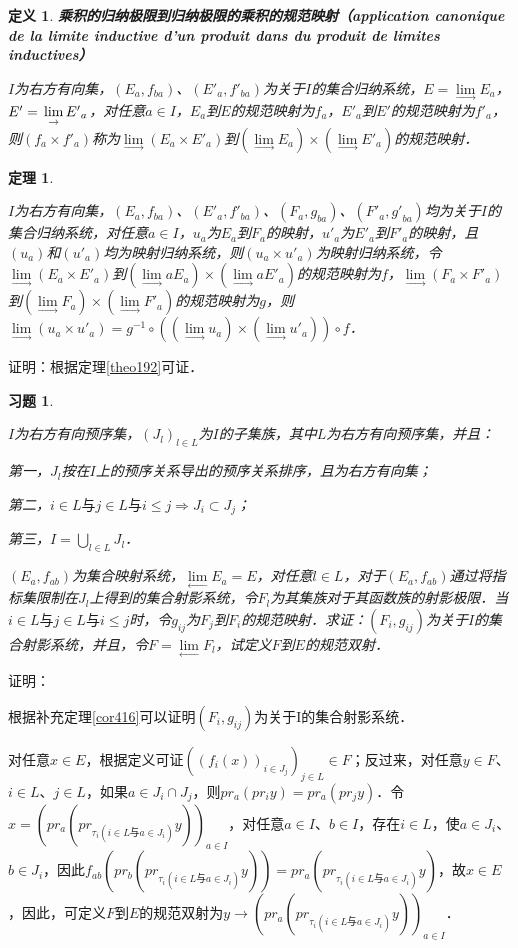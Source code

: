 \documentclass[12pt, a4paper, oneside]{book}
\newtheorem{theo}{定理}
\newtheorem{de}{定义}
\newtheorem{exer}{习题}
\begin{document}
			\begin{de}
				\textbf{乘积的归纳极限到归纳极限的乘积的规范映射（application canonique de la limite inductive d'un produit dans du produit de limites inductives）}
				\par
				$I$为右方有向集，$(E_a, f_{ba})$、$({E'}_a, {f'}_{ba})$为关于$I$的集合归纳系统，$E=\lim\limits_\to E_a$，$E'=\\\lim\limits_\to {E'}_a$，对任意$a\in I$，$E_a$到$E$的规范映射为$f_a$，${E'}_a$到$E'$的规范映射为${f'}_a$，则$(f_a\times {f'}_a)$称为$\lim\limits_\to (E_a\times {E'}_a)$到$(\lim\limits_\to E_a)\times (\lim\limits_\to{E'}_a)$的规范映射．
			\end{de}
					
			\begin{theo}\label{theo193}
				\hfill\par
				$I$为右方有向集，$(E_a, f_{ba})$、$({E'}_a, {f'}_{ba})$、$(F_a, g_{ba})$、$({F'}_a, {g'}_{ba})$均为关于$I$的集合归纳系统，对任意$a\in I$，$u_a$为$E_a$到$F_a$的映射，${u'}_a$为${E'}_a$到${F'}_a$的映射，且$(u_a)$和$({u'}_a)$均为映射归纳系统，则$(u_a\times {u'}_a)$为映射归纳系统，令$\lim\limits_\to (E_a\times {E'}_a)$到$(\lim\limits_\to aE_a)\times (\lim\limits_\to a{E'}_a)$的规范映射为$f$，$\lim\limits_\to (F_a\times {F'}_a)$到$(\lim\limits_\to F_a)\times (\lim\limits_\to {F'}_a)$的规范映射为$g$，则$\lim\limits_\to (u_a\times {u'}_a)= g^{-1}\circ ( (\lim\limits_\to u_a)\times (\lim\limits_\to {u'}_a))\circ f$．
			\end{theo}
			证明：根据定理\ref{theo192}可证．
			
			\begin{exer}\label{exer189}
				\hfill\par
				$I$为右方有向预序集，$(J_l)_{l\in L}$为$I$的子集族，其中$L$为右方有向预序集，并且：
				\par
				第一，$J_l$按在$I$上的预序关系导出的预序关系排序，且为右方有向集；
				\par
				第二，$i\in L\text{与}j\in L\text{与}i\leq j\Rightarrow J_i\subset J_j$；
				\par
				第三，$I=\bigcup\limits_{l\in L}J_l$．
				\par
				$(E_a, f_{ab})$为集合映射系统，$\lim\limits_\gets E_a=E$，对任意$l\in L$，对于$(E_a, f_{ab})$通过将指标集限制在$J_l$上得到的集合射影系统，令$F_l$为其集族对于其函数族的射影极限．当$i\in L\text{与}j\in L\text{与}i\leq j$时，令$g_{ij}$为$F_j$到$F_i$的规范映射．求证：$(F_i, g_{ij})$为关于$I$的集合射影系统，并且，令$F= \lim\limits_\gets F_l$，试定义$F$到$E$的规范双射．
			\end{exer}
			证明：
			\par
			根据补充定理\ref{cor416}可以证明$(F_i, g_{ij})$为关于I的集合射影系统．
			\par
			对任意$x\in E$，根据定义可证$((f_i(x))_{i\in J_j})_{j\in L}\in F$；反过来，对任意$y\in F$、$i\in L$、$j\in L$，如果$a\in J_i\cap J_j$，则$pr_a(pr_iy)=pr_a(pr_jy)$．令$x=(pr_a(pr_{\tau_i(i\in L\text{与}a\in J_i)}y))_{a\in I}$，对任意$a\in I$、$b\in I$，存在$i\in L$，使$a\in J_i$、$b\in J_i$，因此$f_{ab}(pr_b(pr_{\tau_i(i\in L\text{与}a\in J_i)}y))=pr_a(pr_{\tau_i(i\in L\text{与}a\in J_i)}y)$，故$x\in E$，因此，可定义$F$到$E$的规范双射为$y\to (pr_a(pr_{\tau_i(i\in L\text{与}a\in J_i)}y))_{a\in I}$．
			
\end{document}
